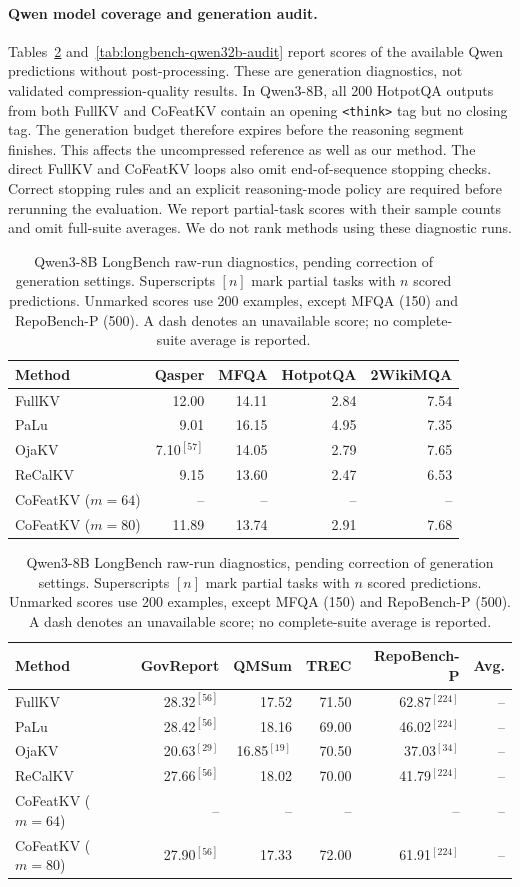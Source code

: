 \documentclass{article} %
\begin{document}
\paragraph{Qwen model coverage and generation audit.}
Tables~\ref{tab:longbench-qwen8b-audit} and~\ref{tab:longbench-qwen32b-audit}
report scores of the available Qwen predictions without post-processing.
These are generation diagnostics, not validated compression-quality results.
In Qwen3-8B, all 200 HotpotQA outputs from both FullKV and CoFeatKV contain
an opening \texttt{<think>} tag but no closing tag. The generation budget
therefore expires before the reasoning segment finishes. This affects the
uncompressed reference as well as our method. The direct FullKV and CoFeatKV
loops also omit end-of-sequence stopping checks. Correct stopping rules and
an explicit reasoning-mode policy are required before rerunning the evaluation.
We report partial-task scores with their sample counts and omit full-suite
averages. We do not rank methods using these diagnostic runs.

\begin{table}[H]
\centering
\caption{Qwen3-8B LongBench raw-run diagnostics, pending correction
of generation settings. Superscripts $[n]$ mark partial tasks with $n$
scored predictions. Unmarked scores use 200 examples, except MFQA (150)
and RepoBench-P (500). A dash denotes an unavailable score; no complete-suite
average is reported.}
\label{tab:longbench-qwen8b-audit}
\small
\setlength{\tabcolsep}{3pt}
\begin{tabular}{lrrrr}
\toprule
Method & Qasper & MFQA & HotpotQA & 2WikiMQA \\
\midrule
FullKV & 12.00 & 14.11 & 2.84 & 7.54 \\
PaLu~\citep{palu} & 9.01 & 16.15 & 4.95 & 7.35 \\
OjaKV~\citep{ojakv} & 7.10$^{[57]}$ & 14.05 & 2.79 & 7.65 \\
ReCalKV~\citep{recalkv} & 9.15 & 13.60 & 2.47 & 6.53 \\
CoFeatKV ($m=64$) & -- & -- & -- & -- \\
CoFeatKV ($m=80$) & 11.89 & 13.74 & 2.91 & 7.68 \\
\bottomrule
\end{tabular}
\par\medskip
\begin{tabular}{lrrrrr}
\toprule
Method & GovReport & QMSum & TREC & RepoBench-P & Avg. \\
\midrule
FullKV & 28.32$^{[56]}$ & 17.52 & 71.50 & 62.87$^{[224]}$ & -- \\
PaLu~\citep{palu} & 28.42$^{[56]}$ & 18.16 & 69.00 & 46.02$^{[224]}$ & -- \\
OjaKV~\citep{ojakv} & 20.63$^{[29]}$ & 16.85$^{[19]}$ & 70.50 & 37.03$^{[34]}$ & -- \\
ReCalKV~\citep{recalkv} & 27.66$^{[56]}$ & 18.02 & 70.00 & 41.79$^{[224]}$ & -- \\
CoFeatKV ($m=64$) & -- & -- & -- & -- & -- \\
CoFeatKV ($m=80$) & 27.90$^{[56]}$ & 17.33 & 72.00 & 61.91$^{[224]}$ & -- \\
\bottomrule
\end{tabular}
\end{table}
\end{document}
